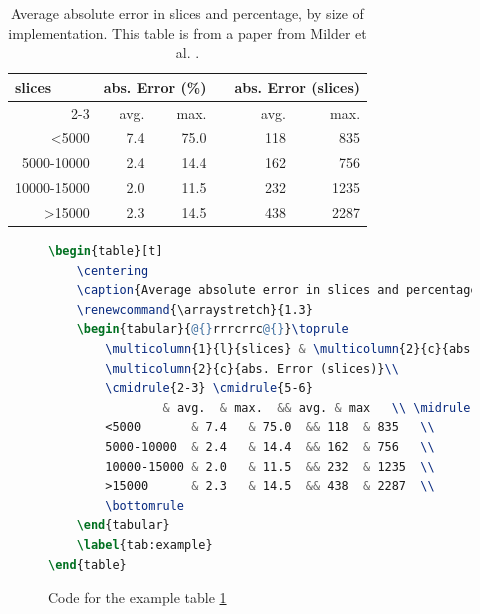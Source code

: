 \begin{table}[t!]
	\centering
	\caption[Average absolute error for the implementations]{Average absolute error in slices and percentage, by size of implementation. This table is from a paper from Milder et al. \cite{Milder2006}.}
	\renewcommand{\arraystretch}{1.3}
	\begin{tabular}{@{}rrrcrr@{}}\toprule
		\multicolumn{1}{l}{slices} & \multicolumn{2}{c}{abs. Error (\%)} & \phantom{abc}& \multicolumn{2}{c}{abs. Error (slices)}\\
		\cmidrule{2-3} \cmidrule{5-6}
		& avg. 	& max. 	&& avg.	& max.	\\ \midrule
		<5000 		& 7.4	& 75.0 	&& 118 	& 835	\\
		5000-10000 	& 2.4	& 14.4	&& 162	& 756	\\
		10000-15000 & 2.0	& 11.5	&& 232	& 1235	\\
		>15000		& 2.3	& 14.5	&& 438	& 2287	\\
		\bottomrule
	\end{tabular}
	\label{tab:example}
\end{table}

\begin{figure}[t!]
	\begin{lstlisting}[language=TeX]
\begin{table}[t]
	\centering
	\caption{Average absolute error in slices and percentage, by size of implementation. This table is from a paper from Milder et al. \cite{Milder2006}.}
	\renewcommand{\arraystretch}{1.3}
	\begin{tabular}{@{}rrrcrrc@{}}\toprule
		\multicolumn{1}{l}{slices} & \multicolumn{2}{c}{abs. Error (\\%)} & \phantom{abc}&
		\multicolumn{2}{c}{abs. Error (slices)}\\
		\cmidrule{2-3} \cmidrule{5-6}
				& avg. 	& max. 	&& avg.	& max 	\\ \midrule
		<5000 		& 7.4	& 75.0 	&& 118 	& 835	\\
		5000-10000 	& 2.4	& 14.4	&& 162	& 756	\\
		10000-15000 & 2.0	& 11.5	&& 232	& 1235	\\
		>15000		& 2.3	& 14.5	&& 438	& 2287	\\
		\bottomrule
	\end{tabular}
	\label{tab:example}
\end{table}

	\end{lstlisting}
	\caption{Code for the example table \ref{tab:example}}
	\label{fig:code_for_tab}
\end{figure}


